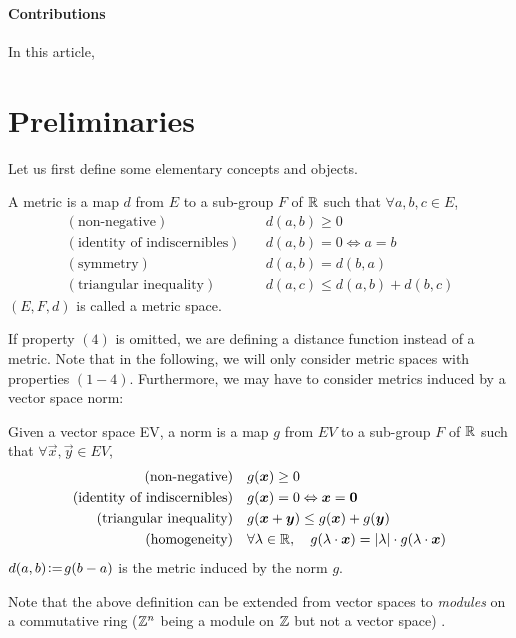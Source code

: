 \documentclass{llncs}
\begin{document}
\paragraph{Contributions} In this article,

\section{Preliminaries}
\label{sec:preliminaries}

Let us first define some elementary concepts and objects.
\begin{definition}
  \label{def:distance}
  A metric is a map $d$ from $E$ to a sub-group $F$ of ${\mathbb{R}}$ such that
  $\forall a,b,c\in E$,
  \begin{align}
    (\text{non-negative})\quad & d(a,b)\geq 0\\
    (\text{identity of indiscernibles}) \quad&  d(a,b)= 0
    \Leftrightarrow a=b\\
    (\text{symmetry})\quad &  d(a,b)=d(b,a)\\
    (\text{triangular inequality})\quad &   d(a,c) \leq d(a,b) + d(b,c)
  \end{align}
$(E, F, d)$ is called a metric space.
\end{definition}
If property $(4)$ is omitted, we are defining a distance function
instead of a metric. Note that in the following, we will only consider
metric spaces with properties $(1-4)$. Furthermore, we may have to
consider  metrics induced by a vector space norm:
\begin{definition}
  \label{def:distance}
  Given a vector space EV, a norm is a map $g$ from  $EV$ to a sub-group
  $F$ of ${\mathbb{R}}$ such that $\forall \vec{x},\vec{y}\in EV$,
  \begin{align}
    (\text{non-negative})\quad & g(\vec{x})\geq 0\\
    (\text{identity of indiscernibles}) \quad&  g(\vec{x})= 0
    \Leftrightarrow \vec{x}=\vec{0}\\
    (\text{triangular inequality})\quad &   g(\vec{x}+\vec{y}) \leq
    g(\vec{x}) + g(\vec{y})\\
    (\text{homogeneity})\quad &  \forall \lambda\in\R, \quad
    g(\lambda\cdot\vec{x}) = |\lambda|\cdot g(\lambda\cdot\vec{x})
  \end{align}
$d(a,b) \!\mathrel{\mathop:}=\! g(b-a)$ is the metric induced by the
  norm $g$.
\end{definition}
Note that the above definition can be extended from vector spaces to
\emph{modules} on a commutative ring (${\mathbb{Z}}^n$ being a module on ${\mathbb{Z}}$
but not a vector space) \cite{Thiel_hdr}.
\end{document}
